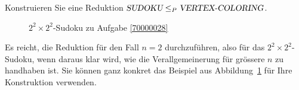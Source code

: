 Konstruieren Sie eine Reduktion
$\textsl{SUDOKU}\le_P\textsl{VERTEX-COLORING}$.

\begin{figure}
\begin{center}
\end{center}
\caption{$2^2\times 2^2$-Sudoku zu Aufgabe \ref{70000028}
\label{70000028:sudoku}}
\end{figure}

\begin{hinweis}
Es reicht, die Reduktion für den Fall $n=2$ durchzuführen, also für
das $2^2\times 2^2$-Sudoku, wenn daraus klar
wird, wie die Verallgemeinerung für grössere $n$ zu handhaben ist.
Sie können ganz konkret das Beispiel aus Abbildung~\ref{70000028:sudoku}
für Ihre Konstruktion verwenden.
\end{hinweis}


